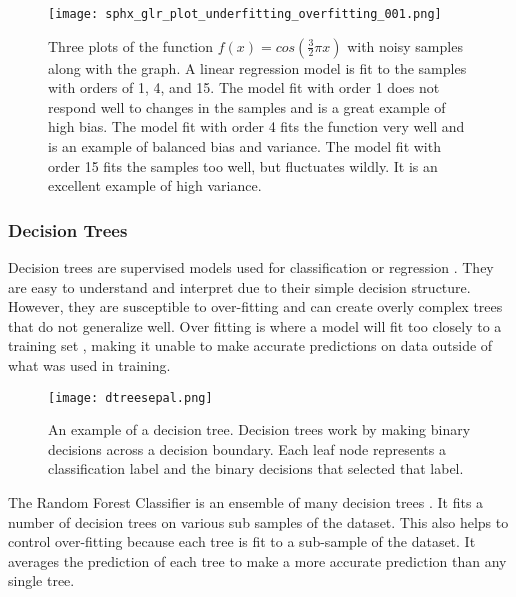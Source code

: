 \begin{figure}[htp]
    \centering
    \texttt{[image: sphx\_glr\_plot\_underfitting\_overfitting\_001.png]}
    \caption{Three plots of the function \( f(x) = cos(\frac{3}{2} \pi x) \) with noisy samples along with the graph. 
    A linear regression model is fit to the samples with orders of 1, 4, and 15.
    The model fit with order 1 does not respond well to changes in the samples and is a great example of high bias.
    The model fit with order 4 fits the function very well and is an example of balanced bias and variance.
    The model fit with order 15 fits the samples too well, but fluctuates wildly. 
    It is an excellent example of high variance.}
    \label{}
\end{figure} 

\medskip

\subsubsection{Decision Trees}
Decision trees are supervised models used for classification or regression \cite{breiman2017classification}.
They are easy to understand and interpret due to their simple decision structure. 
However, they are susceptible to over-fitting and can create overly complex trees that do not generalize well.
Over fitting is where a model will fit too closely to a training set \cite{cawley2010over}, making it unable to make accurate predictions on data outside of what was used in training.

\begin{figure}[htp]
    \centering
    \texttt{[image: dtreesepal.png]}
    \caption{An example of a decision tree.
    Decision trees work by making binary decisions across a decision boundary.
    Each leaf node represents a classification label and the binary decisions that selected that label.}
    \label{}
\end{figure}

\par
The Random Forest Classifier is an ensemble of many decision trees \cite{breiman2001random}.
It fits a number of decision trees on various sub samples of the dataset.
This also helps to control over-fitting because each tree is fit to a sub-sample of the dataset.
It averages the prediction of each tree to make a more accurate prediction than any single tree.\\


